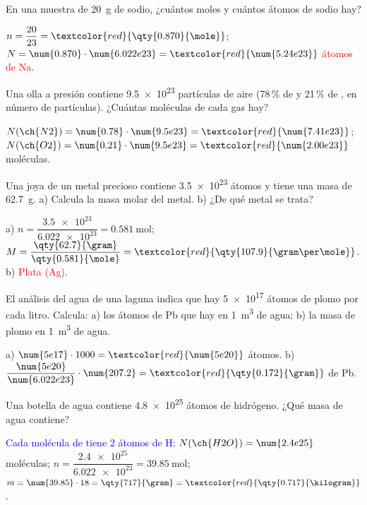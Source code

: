 \begin{exercise}
    En una muestra de \qty{20}{\gram} de sodio, ¿cuántos moles y cuántos átomos de sodio hay?
    \begin{solu}
        \(n = \dfrac{20}{23} = \textcolor{red}{\qty{0.870}{\mole}}\);
        \(N = \num{0.870} \cdot \num{6.022e23} = \textcolor{red}{\num{5.24e23}}\) \textcolor{red}{átomos de Na}.
    \end{solu}
\end{exercise}

\begin{exercise}
    Una olla a presión contiene \num{9.5e23} partículas de aire (78\,\% de  y 21\,\% de , en número de
    partículas). ¿Cuántas moléculas de cada gas hay?
    \begin{solu}
        \(N(\ch{N2}) = \num{0.78} \cdot \num{9.5e23} = \textcolor{red}{\num{7.41e23}}\);
        \(N(\ch{O2}) = \num{0.21} \cdot \num{9.5e23} = \textcolor{red}{\num{2.00e23}}\) moléculas.
    \end{solu}
\end{exercise}

\begin{exercise}
    Una joya de un metal precioso contiene \num{3.5e23} átomos y tiene una masa de \qty{62.7}{\gram}. a) Calcula la masa molar
    del metal. b) ¿De qué metal se trata?
    \begin{solu}
        a) \(n = \dfrac{\num{3.5e23}}{\num{6.022e23}} = \qty{0.581}{\mole}\);
        \(M = \dfrac{\qty{62.7}{\gram}}{\qty{0.581}{\mole}} = \textcolor{red}{\qty{107.9}{\gram\per\mole}}\).
        b) \textcolor{red}{Plata (Ag)}.
    \end{solu}
\end{exercise}

\begin{exercise}
    El análisis del agua de una laguna indica que hay \num{5e17} átomos de plomo por cada litro. Calcula: a) los átomos de Pb que
    hay en \qty{1}{\cubic\metre} de agua; b) la masa de plomo en \qty{1}{\cubic\metre} de agua.
    \begin{solu}
        a) \(\num{5e17} \cdot 1000 = \textcolor{red}{\num{5e20}}\) átomos.
        b) \(\dfrac{\num{5e20}}{\num{6.022e23}} \cdot \num{207.2} = \textcolor{red}{\qty{0.172}{\gram}}\) de Pb.
    \end{solu}
\end{exercise}

\begin{exercise}
    Una botella de agua contiene \num{4.8e25} átomos de hidrógeno. ¿Qué masa de agua contiene?
    \begin{solu}
        \textcolor{blue}{Cada molécula de  tiene 2 átomos de H:} \(N(\ch{H2O}) = \num{2.4e25}\) moléculas;
        \(n = \dfrac{\num{2.4e25}}{\num{6.022e23}} = \qty{39.85}{\mole}\); \(m = \num{39.85} \cdot 18 = \qty{717}{\gram} =
        \textcolor{red}{\qty{0.717}{\kilogram}}\).
    \end{solu}
\end{exercise}

